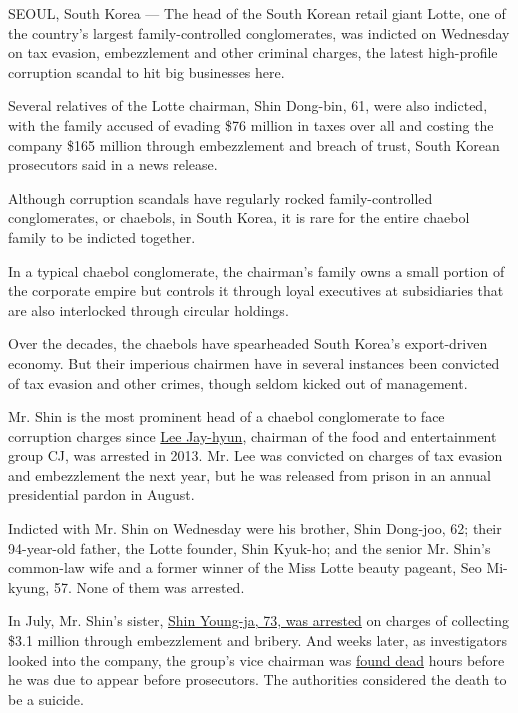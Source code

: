 SEOUL, South Korea --- The head of the South Korean retail giant Lotte,
one of the country's largest family-controlled conglomerates, was
indicted on Wednesday on tax evasion, embezzlement and other criminal
charges, the latest high-profile corruption scandal to hit big
businesses here.

Several relatives of the Lotte chairman, Shin Dong-bin, 61, were also
indicted, with the family accused of evading \$76 million in taxes over
all and costing the company \$165 million through embezzlement and
breach of trust, South Korean prosecutors said in a news release.

Although corruption scandals have regularly rocked family-controlled
conglomerates, or chaebols, in South Korea, it is rare for the entire
chaebol family to be indicted together.

In a typical chaebol conglomerate, the chairman's family owns a small
portion of the corporate empire but controls it through loyal executives
at subsidiaries that are also interlocked through circular holdings.

Over the decades, the chaebols have spearheaded South Korea's
export-driven economy. But their imperious chairmen have in several
instances been convicted of tax evasion and other crimes, though seldom
kicked out of management.

Mr. Shin is the most prominent head of a chaebol conglomerate to face
corruption charges since
\href{http://www.nytimes3xbfgragh.onion/2013/07/03/business/global/south-korean-executives-arrest-seen-as-move-to-tame-conglomerates.html}{Lee
Jay-hyun}, chairman of the food and entertainment group CJ, was arrested
in 2013. Mr. Lee was convicted on charges of tax evasion and
embezzlement the next year, but he was released from prison in an annual
presidential pardon in August.

Indicted with Mr. Shin on Wednesday were his brother, Shin Dong-joo, 62;
their 94-year-old father, the Lotte founder, Shin Kyuk-ho; and the
senior Mr. Shin's common-law wife and a former winner of the Miss Lotte
beauty pageant, Seo Mi-kyung, 57. None of them was arrested.

In July, Mr. Shin's sister,
\href{http://www.bloomberg.com/news/articles/2016-07-06/lotte-heiress-arrested-in-south-korea-amid-bribery-investigation}{Shin
Young-ja, 73, was arrested} on charges of collecting \$3.1 million
through embezzlement and bribery. And weeks later, as investigators
looked into the company, the group's vice chairman was
\href{http://www.nytimes3xbfgragh.onion/2016/08/27/business/international/south-korea-lotte-lee-in-won.html}{found
dead} hours before he was due to appear before prosecutors. The
authorities considered the death to be a suicide.


